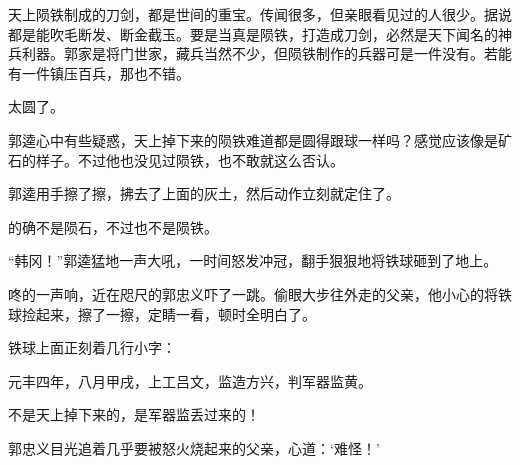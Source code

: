 天上陨铁制成的刀剑，都是世间的重宝。传闻很多，但亲眼看见过的人很少。据说都是能吹毛断发、断金截玉。要是当真是陨铁，打造成刀剑，必然是天下闻名的神兵利器。郭家是将门世家，藏兵当然不少，但陨铁制作的兵器可是一件没有。若能有一件镇压百兵，那也不错。

太圆了。

郭逵心中有些疑惑，天上掉下来的陨铁难道都是圆得跟球一样吗？感觉应该像是矿石的样子。不过他也没见过陨铁，也不敢就这么否认。

郭逵用手擦了擦，拂去了上面的灰土，然后动作立刻就定住了。

的确不是陨石，不过也不是陨铁。

“韩冈！”郭逵猛地一声大吼，一时间怒发冲冠，翻手狠狠地将铁球砸到了地上。

咚的一声响，近在咫尺的郭忠义吓了一跳。偷眼大步往外走的父亲，他小心的将铁球捡起来，擦了一擦，定睛一看，顿时全明白了。

铁球上面正刻着几行小字：

元丰四年，八月甲戌，上工吕文，监造方兴，判军器监黄。

不是天上掉下来的，是军器监丢过来的！

郭忠义目光追着几乎要被怒火烧起来的父亲，心道：‘难怪！’

